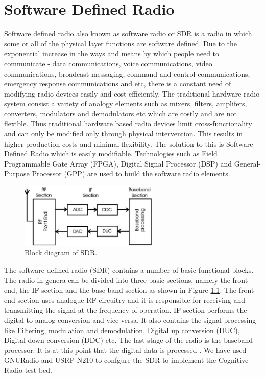 \chapter{Software Defined Radio}
Software defined radio also known as software radio or SDR is a radio in which
some or all of the physical layer functions are software defined. Due to the  
exponential increase in the ways and means by which people need to communicate
- data communications, voice communications, video communications, broadcast 
messaging, command and control communications, emergency response 
communications and etc, there is a constant need of modifying radio devices 
easily and cost efficiently. The traditional hardware radio system consist a 
variety of analogy elements such as mixers, filters, amplifers, converters, 
modulators and demodulators etc which are costly and are not flexible. Thus 
traditional hardware based radio devices limit cross-functionality and can 
only be modified only through physical intervention. This results in higher 
production costs and minimal flexibility. The solution to this is Software 
Defined Radio which is easily modifiable. Technologies such as Field 
Programmable Gate Array (FPGA), Digital Signal Processor (DSP) and 
General-Purpose Processor (GPP) are used to build the software radio elements.


\begin{figure}
\centering
\includegraphics[width=0.59\textwidth]{sdrBlock}
\caption{Block diagram of SDR.}
\label{sdrBlock}
\end{figure}

The software defined radio (SDR) contains a number of basic functional blocks.
The radio in genera can be divided into three basic sections, namely the front
end, the IF section and the base-band section as shown in Figure \ref{sdrBlock}. The 
front end section uses analogue RF circuitry and it is responsible for 
receiving and transmitting the signal at the frequency of operation. IF 
section performs the digital to analog conversion and vice versa. It also 
contains the signal processing like Filtering, modulation and demodulation, 
Digital up conversion (DUC), Digital down conversion (DDC) etc. The last stage
of the radio is the baseband processor. It is at this point that the digital 
data is processed \cite{miller08}\cite{kranthi13}.
We have used GNURadio and USRP N210 to confgure the SDR to implement the
Cognitive Radio test-bed. 

